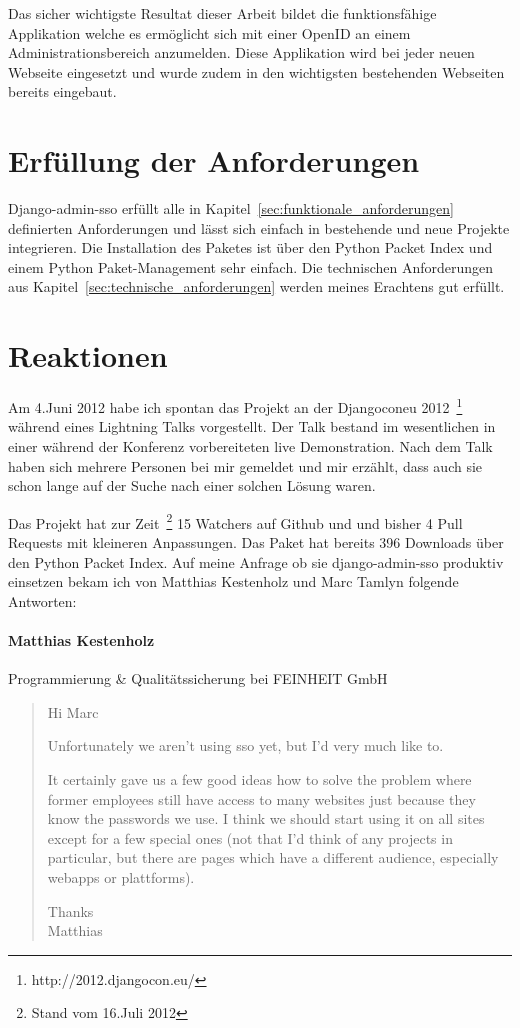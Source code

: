 Das sicher wichtigste Resultat dieser Arbeit bildet die funktionsfähige Applikation welche es ermöglicht sich mit einer OpenID an einem Administrationsbereich anzumelden. Diese Applikation wird bei jeder neuen Webseite eingesetzt und wurde zudem in den wichtigsten bestehenden Webseiten bereits eingebaut.

\section{Erfüllung der Anforderungen}
\label{sec:erfüllung_der_anforderungen}
Django-admin-sso erfüllt alle in Kapitel~\ref{sec:funktionale_anforderungen} definierten Anforderungen und lässt sich einfach in bestehende und neue Projekte integrieren. Die Installation des Paketes ist über den Python Packet Index und einem Python Paket-Management sehr einfach. Die technischen Anforderungen aus Kapitel~\ref{sec:technische_anforderungen} werden meines Erachtens gut erfüllt.

\section{Reaktionen}
\label{sec:reaktionen}
Am 4.Juni 2012 habe ich spontan das Projekt an der Djangoconeu 2012~\footnote{http://2012.djangocon.eu/} während eines Lightning Talks vorgestellt. Der Talk bestand im wesentlichen in einer während der Konferenz vorbereiteten live Demonstration. Nach dem Talk haben sich mehrere Personen bei mir gemeldet und mir erzählt, dass auch sie schon lange auf der Suche nach einer solchen Lösung waren.

Das Projekt hat zur Zeit~\footnote{Stand vom 16.Juli 2012} 15 Watchers auf Github und und bisher 4 Pull Requests mit kleineren Anpassungen. Das Paket hat bereits 396 Downloads über den Python Packet Index. Auf meine Anfrage ob sie django-admin-sso produktiv einsetzen bekam ich von Matthias Kestenholz und Marc Tamlyn folgende Antworten:

\paragraph{Matthias Kestenholz}
Programmierung \& Qualitätssicherung bei FEINHEIT GmbH
\begin{quote}
  Hi Marc

  Unfortunately we aren't using sso yet, but I'd very much like to.

  It certainly gave us a few good ideas how to solve the problem where
  former employees still have access to many websites just because they
  know the passwords we use. I think we should start using it on all
  sites except for a few special ones (not that I'd think of any
  projects in particular, but there are pages which have a different
  audience, especially webapps or plattforms).


  Thanks \\
  Matthias
\end{quote}

